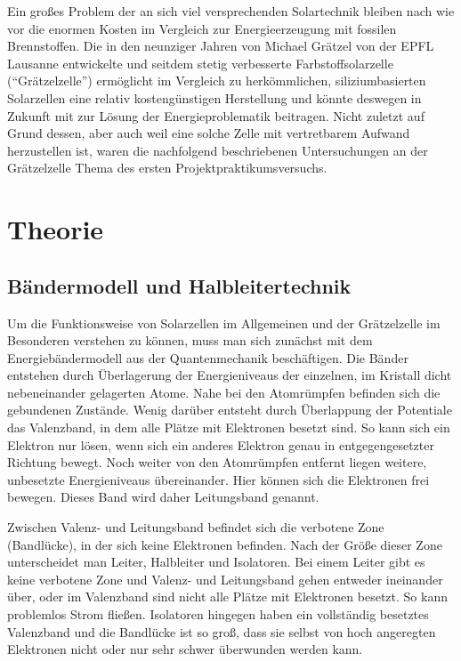 \documentclass[11pt]{scrartcl}
\begin{document}
Ein großes Problem der an sich viel versprechenden Solartechnik bleiben nach wie vor die enormen Kosten im Vergleich zur Energieerzeugung mit fossilen Brenn\-stoffen. Die in den neunziger Jahren von Michael Grätzel von der EPFL Lausanne entwickelte und seitdem stetig verbesserte Farbstoff\-solarzelle ("`Grätzelzelle"') ermöglicht im Vergleich zu herkömmlichen, siliziumbasierten Solarzellen eine relativ kostengünstigen Herstellung und könnte deswegen in Zukunft mit zur Lösung der Energieproblematik beitragen. Nicht zuletzt auf Grund dessen, aber auch weil eine solche Zelle mit vertretbarem Aufwand herzustellen ist, waren die nachfolgend beschriebenen Untersuchungen an der Grätzelzelle Thema des ersten Projektpraktikumsversuchs.





\section{Theorie}
\subsection{B\"andermodell und Halbleitertechnik}
Um die Funktionsweise von Solarzellen im Allgemeinen und der Gr\"atzelzelle im Besonderen verstehen zu k\"onnen, muss man sich zun\"achst mit dem Energieb\"andermodell aus der Quantenmechanik besch\"aftigen. Die B\"ander entstehen durch \"Uberlagerung der Energieniveaus der einzelnen, im Kristall dicht nebeneinander gelagerten Atome. Nahe bei den Atomr\"umpfen befinden sich die gebundenen Zust\"ande. Wenig dar\"uber entsteht durch \"Uberlappung der Potentiale das Valenzband, in dem alle Pl\"atze mit Elektronen besetzt sind. So kann sich ein Elektron nur lösen, wenn sich ein anderes Elektron genau in entgegengesetzter Richtung bewegt. 
Noch weiter von den Atomr\"umpfen entfernt liegen weitere, unbesetzte Energieniveaus \"ubereinander. Hier k\"onnen sich die Elektronen frei bewegen. Dieses Band wird daher Leitungsband genannt.

Zwischen Valenz- und Leitungsband befindet sich die verbotene Zone (Bandl\"ucke), in der sich keine Elektronen befinden. Nach der Gr\"o\ss{}e dieser Zone unterscheidet man Leiter, Halbleiter und Isolatoren. Bei einem Leiter gibt es keine verbotene Zone und Valenz- und Leitungsband gehen entweder ineinander \"uber, oder im Valenzband sind nicht alle Pl\"atze mit Elektronen besetzt. So kann problemlos Strom fließen. Isolatoren hingegen haben ein vollst\"andig besetztes Valenzband und die Bandl\"ucke ist so gro\ss{}, dass sie selbst von hoch angeregten Elektronen nicht oder nur sehr schwer \"uberwunden werden kann.
\end{document}
